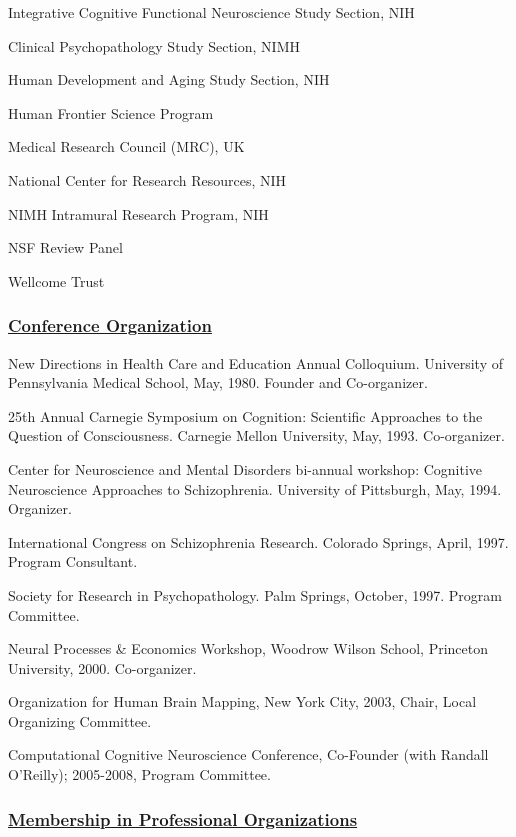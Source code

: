 \documentclass[10 pt]{article}
\begin{document}
Integrative Cognitive Functional Neuroscience Study Section, NIH

Clinical Psychopathology Study Section, NIMH

Human Development and Aging Study Section, NIH

Human Frontier Science Program

Medical Research Council (MRC), UK

National Center for Research Resources, NIH

NIMH Intramural Research Program, NIH

NSF Review Panel

Wellcome Trust


\subsubsection*{\underline{Conference Organization}} \label{secCO}
    \smallskip

New Directions in Health Care and Education Annual Colloquium. University of Pennsylvania Medical School, May, 1980. Founder and Co-organizer.

25th Annual Carnegie Symposium on Cognition: Scientific Approaches to the Question of Consciousness. Carnegie Mellon University, May, 1993. Co-organizer.

Center for Neuroscience and Mental Disorders bi-annual workshop: Cognitive Neuroscience Approaches to Schizophrenia. University of Pittsburgh, May, 1994. Organizer.

International Congress on Schizophrenia Research. Colorado Springs, April, 1997. Program Consultant.

Society for Research in Psychopathology. Palm Springs, October, 1997. Program Committee.

Neural Processes \& Economics Workshop, Woodrow Wilson School, Princeton University, 2000. Co-organizer.

Organization for Human Brain Mapping, New York City, 2003, Chair, Local Organizing Committee.

Computational Cognitive Neuroscience Conference, Co-Founder (with Randall O’Reilly); 2005-2008, Program Committee.


\subsubsection*{\underline{Membership in Professional Organizations}} \label{secMiPO}
    \smallskip
\end{document}
